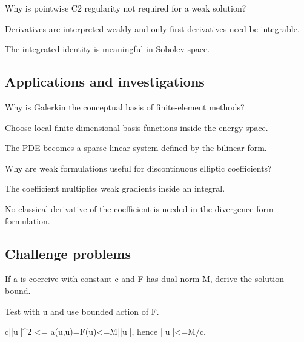 \begin{exercise}\label{exr:iii23-expand-12}
Why is pointwise C2 regularity not required for a weak solution?
\end{exercise}
\begin{hint}
Derivatives are interpreted weakly and only first derivatives need be integrable.
\end{hint}
\begin{solution}
The integrated identity is meaningful in Sobolev space.
\end{solution}

\subsection*{Applications and investigations}

\begin{exercise}\label{exr:iii23-expand-13}
Why is Galerkin the conceptual basis of finite-element methods?
\end{exercise}
\begin{hint}
Choose local finite-dimensional basis functions inside the energy space.
\end{hint}
\begin{solution}
The PDE becomes a sparse linear system defined by the bilinear form.
\end{solution}

\begin{exercise}\label{exr:iii23-expand-14}
Why are weak formulations useful for discontinuous elliptic coefficients?
\end{exercise}
\begin{hint}
The coefficient multiplies weak gradients inside an integral.
\end{hint}
\begin{solution}
No classical derivative of the coefficient is needed in the divergence-form formulation.
\end{solution}

\subsection*{Challenge problems}

\begin{exercise}\label{exr:iii23-expand-15}
If a is coercive with constant c and F has dual norm M, derive the solution bound.
\end{exercise}
\begin{hint}
Test with u and use bounded action of F.
\end{hint}
\begin{solution}
c||u||\textasciicircum{}2 <= a(u,u)=F(u)<=M||u||, hence ||u||<=M/c.
\end{solution}

